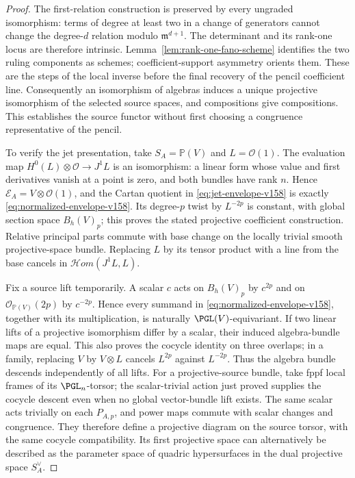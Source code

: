 \documentclass[11pt,reqno]{amsart}
\numberwithin{equation}{section}
\theoremstyle{definition}\newtheorem{definition}[theorem]{Definition}
\theoremstyle{remark}\newtheorem{remark}[theorem]{Remark}
\newcommand{\Pj}{\mathbb P}\newcommand{\A}{\mathbb A}
\newcommand{\OO}{\mathcal O}\newcommand{\II}{\mathcal I}
\begin{document}
\begin{proof}
The first-relation construction is preserved by every ungraded
isomorphism: terms of degree at least two in a change of generators
cannot change the degree-$d$ relation modulo $\mathfrak m^{d+1}$.
The determinant and its rank-one locus are therefore intrinsic.
Lemma~\ref{lem:rank-one-fano-scheme} identifies the two ruling
components as schemes; coefficient-support asymmetry orients them.
These are the steps of the local inverse before the final recovery
of the pencil coefficient line. Consequently an isomorphism of
algebras induces a unique projective isomorphism of the selected
source spaces, and compositions give compositions. This establishes
the source functor without first choosing a congruence representative
of the pencil.

To verify the jet presentation, take $S_A=\Pj(V)$ and $L=\OO(1)$.
The evaluation map $H^0(L)\otimes\OO\to J^1L$ is an isomorphism:
a linear form whose value and first derivatives vanish at a point is
zero, and both bundles have rank $n$. Hence
$\mathscr E_A=V\otimes\OO(1)$, and the Cartan quotient in
\eqref{eq:jet-envelope-v158} is exactly
\eqref{eq:normalized-envelope-v158}. Its degree-$p$ twist by
$L^{-2p}$ is constant, with global section space $B_h(V)_p$;
this proves the stated projective coefficient construction. Relative
principal parts commute with base change on the locally trivial smooth
projective-space bundle. Replacing $L$ by its tensor product with a
line from the base cancels in $\mathcal Hom(J^1L,L)$.

Fix a source lift temporarily. A scalar $c$ acts on $B_h(V)_p$ by
$c^{2p}$ and on $\OO_{\Pj(V)}(2p)$ by $c^{-2p}$. Hence every summand
in \eqref{eq:normalized-envelope-v158}, together with its multiplication,
is naturally $\PGL(V)$-equivariant. If two linear lifts of a projective
isomorphism differ by a scalar, their induced algebra-bundle maps
are equal. This also proves the cocycle identity on three overlaps;
in a family, replacing $V$ by $V\otimes L$ cancels $L^{2p}$ against
$L^{-2p}$. Thus the algebra bundle descends independently of all
lifts. For a projective-source bundle, take fppf local frames of its
$\PGL_n$-torsor; the scalar-trivial action just proved supplies the
cocycle descent even when no global vector-bundle lift exists. The same scalar acts trivially on each $P_{A,p}$, and power
maps commute with scalar changes and congruence. They therefore
define a projective diagram on the source torsor, with the same
cocycle compatibility. Its first projective space can alternatively
be described as the parameter space of quadric hypersurfaces in the
dual projective space $S_A^\vee$.


\end{proof}
\end{document}
